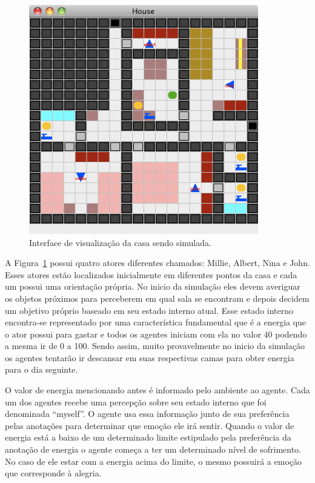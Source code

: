 \begin{figure}
	\begin{center}
		\includegraphics[width=10cm]{figuras/sims.png}
	\end{center}
	\caption{Interface de visualização da casa sendo simulada.}
	\label{fig:sims}
\end{figure}

A Figura~\ref{fig:sims} possui quatro atores diferentes chamados: Millie,
Albert, Nina e John. Esses atores estão localizados inicialmente em diferentes
pontos da casa e cada um possui uma orientação própria. No inicio da simulação eles
devem averiguar os objetos próximos para perceberem em qual sala se encontram
e depois decidem um objetivo próprio baseado em seu estado interno atual.
Esse estado interno encontra-se representado por uma característica
fundamental que é a energia que o ator possui para gastar e todos os agentes
iniciam com ela no valor 40 podendo a mesma ir de 0 a 100. Sendo
assim, muito provavelmente no inicio da simulação os agentes tentarão ir
descansar em suas respectivas camas para obter energia para o dia seguinte.

O valor de energia mencionando antes é informado pelo ambiente ao
agente. Cada um dos agentes recebe uma percepção sobre seu estado
interno que foi denominada ``myself''. O agente usa essa informação junto de
sua preferência pelas anotações para determinar que emoção ele irá sentir.
Quando o valor de energia está a baixo de um determinado limite estipulado pela
preferência da anotação de energia o agente começa a ter um
determinado nível de sofrimento. No caso de ele estar com a energia acima do
limite, o mesmo possuirá a emoção que corresponde à alegria.

